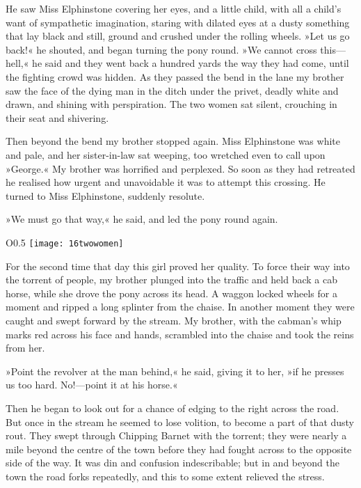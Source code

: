 He saw Miss Elphinstone covering her eyes, and a little child, with all a child's want of sympathetic imagination, staring with dilated eyes at a dusty something that lay black and still, ground and crushed under the rolling wheels. »Let us go back!« he shouted, and began turning the pony round. »We cannot cross this—hell,« he said and they went back a hundred yards the way they had come, until the fighting crowd was hidden. As they passed the bend in the lane my brother saw the face of the dying man in the ditch under the privet, deadly white and drawn, and shining with perspiration. The two women sat silent, crouching in their seat and shivering.

Then beyond the bend my brother stopped again. Miss Elphinstone was white and pale, and her sister-in-law sat weeping, too wretched even to call upon »George.« My brother was horrified and perplexed. So soon as they had retreated he realised how urgent and unavoidable it was to attempt this crossing. He turned to Miss Elphinstone, suddenly resolute.

»We must go that way,« he said, and led the pony round again.

\begin{a4}
	\begin{wrapfigure}{O}{0.5\textwidth}
		\centering
		\texttt{[image: 16twowomen]}
	\end{wrapfigure}
\end{a4}

For the second time that day this girl proved her quality. To force their way into the torrent of people, my brother plunged into the traffic and held back a cab horse, while she drove the pony across its head. A waggon locked wheels for a moment and ripped a long splinter from the chaise. In another moment they were caught and swept forward by the stream. My brother, with the cabman's whip marks red across his face and hands, scrambled into the chaise and took the reins from her.

»Point the revolver at the man behind,« he said, giving it to her, »if he presses us too hard. No!—point it at his horse.«

Then he began to look out for a chance of edging to the right across the road. But once in the stream he seemed to lose volition, to become a part of that dusty rout. They swept through Chipping Barnet with the torrent; they were nearly a mile beyond the centre of the town before they had fought across to the opposite side of the way. It was din and confusion indescribable; but in and beyond the town the road forks repeatedly, and this to some extent relieved the stress.

